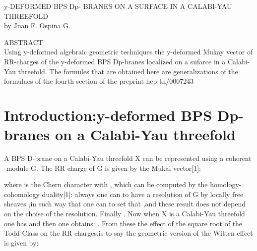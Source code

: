 \documentclass[a4paper,a4paper]{article}
\begin{document}
\begin{center}
y-DEFORMED BPS Dp- BRANES ON A SURFACE  IN A CALABI-YAU THREEFOLD\\ [.25in]
by Juan F. Ospina G.
\end{center}
\begin{center}
ABSTRACT \\ [.25in]
Using y-deformed algebraic geometric techniques the y-deformed Mukay vector of RR-charges of the y-deformed BPS Dp-branes localized on a sufarce in a Calabi-Yau threefold. The formules that are obtained here are generalizations of the formulaes of the fourth section of the preprint hep-th/0007243
\end{center}

\section{Introduction:y-deformed BPS Dp-branes on a Calabi-Yau threefold}
\setlength{\baselineskip}{20pt}


A BPS D-brane on a Calabi-Yau threefold X can be represented using a  coherent \coordHE{}-module G. The RR charge of G is given by the Mukai vector[1]:
\begin{center}
{  \coordHE{} }
\end{center}

where \coordHE{} is the Chern character with \coordHE{}, which can be computed by the homology-cohomology duality[1]:  always one can to have a resolution of G by locally free sheaves  \coordHE{},in such way that one can to set that
\coordHE{},and these result does not depend on the choise of the resolution. Finally  \coordHE{}. Now when X is a Calabi-Yau threefold one has \coordHE{} and then one obtains: \coordHE{}.
From these the effect of the square root of the Todd Class on the RR charges,is to say the geometric version of the Witten effect is given by:
\begin{center}
{  \coordHE{} }
\end{center}
\end{document}
